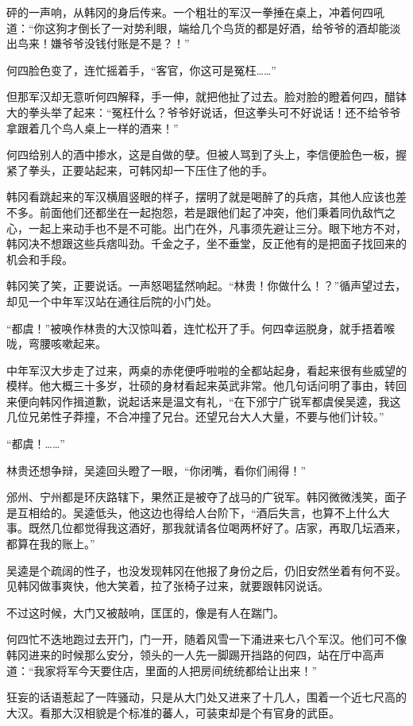 砰的一声响，从韩冈的身后传来。一个粗壮的军汉一拳捶在桌上，冲着何四吼道：“你这狗才倒长了一对势利眼，端给几个鸟货的都是好酒，给爷爷的酒却能淡出鸟来！嫌爷爷没钱付账是不是？！”

何四脸色变了，连忙摇着手，“客官，你这可是冤枉……”

但那军汉却无意听何四解释，手一伸，就把他扯了过去。脸对脸的瞪着何四，醋钵大的拳头举了起来：“冤枉什么？爷爷好说话，但这拳头可不好说话！还不给爷爷拿跟着几个鸟人桌上一样的酒来！”

何四给别人的酒中掺水，这是自做的孽。但被人骂到了头上，李信便脸色一板，握紧了拳头，正要站起来，可韩冈却一下压住了他的手。

韩冈看跳起来的军汉横眉竖眼的样子，摆明了就是喝醉了的兵痞，其他人应该也差不多。前面他们还都坐在一起抱怨，若是跟他们起了冲突，他们秉着同仇敌忾之心，一起上来动手也不是不可能。出门在外，凡事须先避让三分。眼下地方不对，韩冈决不想跟这些兵痞叫劲。千金之子，坐不垂堂，反正他有的是把面子找回来的机会和手段。

韩冈笑了笑，正要说话。一声怒喝猛然响起。“林贵！你做什么！？”循声望过去，却见一个中年军汉站在通往后院的小门处。

“都虞！”被唤作林贵的大汉惊叫着，连忙松开了手。何四幸运脱身，就手捂着喉咙，弯腰咳嗽起来。

中年军汉大步走了过来，两桌的赤佬便呼啦啦的全都站起身，看起来很有些威望的模样。他大概三十多岁，壮硕的身材看起来英武非常。他几句话问明了事由，转回来便向韩冈作揖道歉，说起话来是温文有礼，“在下邠宁广锐军都虞侯吴逵，我这几位兄弟性子莽撞，不合冲撞了兄台。还望兄台大人大量，不要与他们计较。”

“都虞！……”

林贵还想争辩，吴逵回头瞪了一眼，“你闭嘴，看你们闹得！”

邠州、宁州都是环庆路辖下，果然正是被夺了战马的广锐军。韩冈微微浅笑，面子是互相给的。吴逵低头，他这边也得给人台阶下，“酒后失言，也算不上什么大事。既然几位都觉得我这酒好，那我就请各位喝两杯好了。店家，再取几坛酒来，都算在我的账上。”

吴逵是个疏阔的性子，也没发现韩冈在他报了身份之后，仍旧安然坐着有何不妥。见韩冈做事爽快，他大笑着，拉了张椅子过来，就要跟韩冈说话。

不过这时候，大门又被敲响，匡匡的，像是有人在踹门。

何四忙不迭地跑过去开门，门一开，随着风雪一下涌进来七八个军汉。他们可不像韩冈进来的时候那么安分，领头的一人先一脚踢开挡路的何四，站在厅中高声道：“我家将军今天要住店，里面的人把房间统统都给让出来！”

狂妄的话语惹起了一阵骚动，只是从大门处又进来了十几人，围着一个近七尺高的大汉。看那大汉相貌是个标准的蕃人，可装束却是个有官身的武臣。

